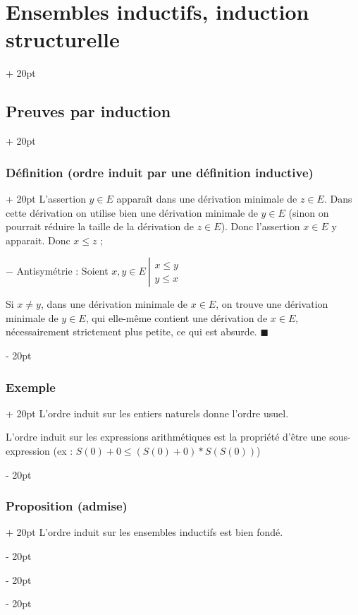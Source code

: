 \documentclass[a4paper, 12pt, twoside]{article}
\renewcommand{\le}{\leqslant}
\newcommand{\ind}[1][20pt]{\advance\leftskip + #1}
\newcommand{\deind}[1][20pt]{\advance\leftskip - #1}
\newenvironment{indt}[2][20pt]{#2 \par \ind[#1]}{\par \deind} %
\begin{document}
\begin{indt}{\section{Ensembles inductifs, induction structurelle}}
\begin{indt}{\subsection{Preuves par induction}}
\begin{indt}{\subsubsection{Définition (ordre induit par une définition inductive)}}
                L'assertion $y \in E$ apparaît dans une dérivation minimale de $z \in E$. Dans cette dérivation on utilise bien une dérivation minimale de $y \in E$ (sinon on pourrait réduire la taille de la dérivation de $z \in E$). Donc l'assertion $x \in E$ y apparait. Donc $x \le z$ ;
                
                \vspace{6pt}
                
                $-$ Antisymétrie : Soient
                $
                    x, y \in E\
                    \left| \!
                    \begin{array}{l}
                        x \le y
                        \\
                        y \le x
                    \end{array}
                    \right.
                $
                
                Si $x \neq y$, dans une dérivation minimale de $x \in E$, on trouve une dérivation minimale de $y \in E$, qui elle-même contient une dérivation de $x \in E$, nécessairement strictement plus petite, ce qui est absurde.
                $\blacksquare$
            \end{indt}
            
            \vspace{12pt}
            
            \begin{indt}{\subsubsection{Exemple}}
                L'ordre induit sur les entiers naturels donne l'ordre usuel.
                
                L'ordre induit sur les expressions arithmétiques est la propriété d'être une sous-expression (ex : $S(0) + 0 \le (S(0) + 0) * S(S(0))$)
            \end{indt}
            
            \vspace{12pt}
            
            \begin{indt}{\subsubsection{Proposition (admise)}}
                L'ordre induit sur les ensembles inductifs est bien fondé.
            \end{indt}
            

\end{indt}
\end{indt}
\end{document}
